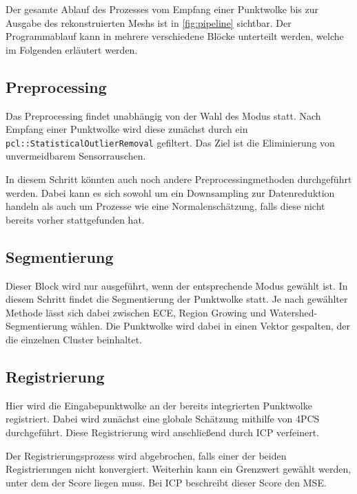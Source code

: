 Der gesamte Ablauf des Prozesses vom Empfang einer Punktwolke bis zur Ausgabe des rekonstruierten Meshs ist in \autoref{fig:pipeline} sichtbar.
Der Programmablauf kann in mehrere verschiedene Blöcke unterteilt werden, welche im Folgenden erläutert werden.


\subsection{Preprocessing}
\label{subsec:pipeline-preprocessing}

Das Preprocessing findet unabhängig von der Wahl des Modus statt.
Nach Empfang einer Punktwolke wird diese zunächst durch ein \texttt{pcl::StatisticalOutlierRemoval} gefiltert.
Das Ziel ist die Eliminierung von unvermeidbarem Sensorrauschen.

In diesem Schritt könnten auch noch andere Preprocessingmethoden durchgeführt werden.
Dabei kann es sich sowohl um ein Downsampling zur Datenreduktion handeln als auch um Prozesse wie eine Normalenschätzung, falls diese nicht bereits vorher stattgefunden hat.


\subsection{Segmentierung}
\label{subsec:pipeline-segmentierung}

Dieser Block wird nur ausgeführt, wenn der entsprechende Modus gewählt ist.
In diesem Schritt findet die Segmentierung der Punktwolke statt.
Je nach gewählter Methode lässt sich dabei zwischen \ac{ECE}, Region Growing und Watershed-Segmentierung wählen.
Die Punktwolke wird dabei in einen Vektor gespalten, der die einzelnen Cluster beinhaltet.


\subsection{Registrierung}
\label{subsec:pipeline-registrierung}

Hier wird die Eingabepunktwolke an der bereits integrierten Punktwolke registriert.
Dabei wird zunächst eine globale Schätzung mithilfe von \ac{4PCS} durchgeführt.
Diese Registrierung wird anschließend durch \ac{ICP} verfeinert.

Der Registrierungsprozess wird abgebrochen, falls einer der beiden Registrierungen nicht konvergiert.
Weiterhin kann ein Grenzwert gewählt werden, unter dem der Score liegen muss.
Bei \ac{ICP} beschreibt dieser Score den \ac{MSE}.

